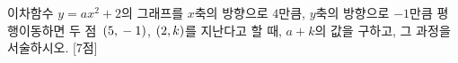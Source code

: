 이차함수 $y=ax^2+2$의 그래프를 $x$축의 방향으로 $4$만큼, $y$축의 방향으로 $-1$만큼 평행이동하면 두 점~$(5{,}\mkern3mu -1)$, $(2{,}\mkern3mu k)$를 지난다고 할 때, $a+k$의 값을 구하고, 그 과정을 서술하시오.  \mbox{[7점]}
